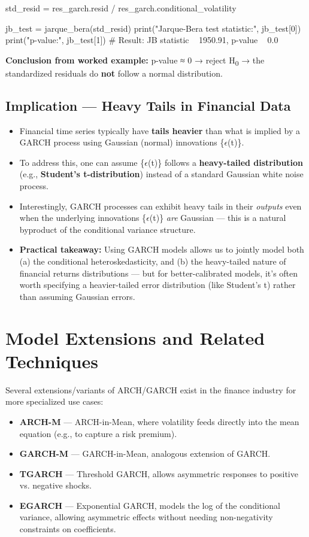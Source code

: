 \documentclass[12pt,openany]{book}
\theoremstyle{definition}
\theoremstyle{remark}
\begin{document}
\begin{python}
std_resid = res_garch.resid / res_garch.conditional_volatility

jb_test = jarque_bera(std_resid)
print("Jarque-Bera test statistic:", jb_test[0])
print("p-value:", jb_test[1])
# Result: JB statistic ~ 1950.91, p-value ~ 0.0
\end{python}

\textbf{Conclusion from worked example:} p-value ≈ 0 → reject H\textsubscript{0} → the standardized residuals do \textbf{not} follow a normal distribution.

\subsection{Implication — Heavy Tails in Financial Data}

\begin{itemize}
\item Financial time series typically have \textbf{tails heavier} than what is implied by a GARCH process using Gaussian (normal) innovations \{\ensuremath{\epsilon}(t)\}.
\item To address this, one can assume \{\ensuremath{\epsilon}(t)\} follows a \textbf{heavy-tailed distribution} (e.g., \textbf{Student's t-distribution}) instead of a standard Gaussian white noise process.
\item Interestingly, GARCH processes can exhibit heavy tails in their \emph{outputs} even when the underlying innovations \{\ensuremath{\epsilon}(t)\} \emph{are} Gaussian — this is a natural byproduct of the conditional variance structure.
\item \textbf{Practical takeaway:} Using GARCH models allows us to jointly model both (a) the conditional heteroskedasticity, and (b) the heavy-tailed nature of financial returns distributions — but for better-calibrated models, it's often worth specifying a heavier-tailed error distribution (like Student's t) rather than assuming Gaussian errors.
\end{itemize}


\section{Model Extensions and Related Techniques}

Several extensions/variants of ARCH/GARCH exist in the finance industry for more specialized use cases:

\begin{itemize}
\item \textbf{ARCH-M} — ARCH-in-Mean, where volatility feeds directly into the mean equation (e.g., to capture a risk premium).
\item \textbf{GARCH-M} — GARCH-in-Mean, analogous extension of GARCH.
\item \textbf{TGARCH} — Threshold GARCH, allows asymmetric responses to positive vs. negative shocks.
\item \textbf{EGARCH} — Exponential GARCH, models the log of the conditional variance, allowing asymmetric effects without needing non-negativity constraints on coefficients.
\end{itemize}
\end{document}
